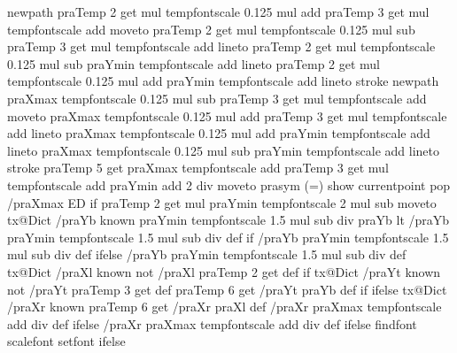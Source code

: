 {{{{          newpath
          praTemp 2 get \pst@number\psxunit\space mul tempfontscale 0.125 mul add
          praTemp 3 get \pst@number\psyunit\space mul tempfontscale add moveto
          praTemp 2 get \pst@number\psxunit\space mul tempfontscale 0.125 mul sub
          praTemp 3 get \pst@number\psyunit\space mul tempfontscale add lineto
          praTemp 2 get \pst@number\psxunit\space mul tempfontscale 0.125 mul sub
          praYmin tempfontscale add lineto
          praTemp 2 get \pst@number\psxunit\space mul tempfontscale 0.125 mul add
          praYmin tempfontscale add lineto
          stroke
          newpath
          praXmax tempfontscale 0.125 mul sub
          praTemp 3 get \pst@number\psyunit\space mul tempfontscale add moveto
          praXmax tempfontscale 0.125 mul add
          praTemp 3 get \pst@number\psyunit\space mul tempfontscale add lineto
          praXmax tempfontscale 0.125 mul add
          praYmin tempfontscale add lineto
          praXmax tempfontscale 0.125 mul sub
          praYmin tempfontscale add lineto
          stroke
          praTemp 5 get {
          praXmax tempfontscale add
          praTemp 3 get \pst@number\psyunit\space mul tempfontscale add praYmin add 2 div moveto
          prasym (=) show currentpoint pop /praXmax ED} if
         praTemp 2 get \pst@number\psxunit\space mul praYmin tempfontscale 2 mul sub moveto %
         tx@Dict /praYb known {
         praYmin tempfontscale 1.5 mul sub \pst@number\psyunit\space div praYb lt {
         /praYb praYmin tempfontscale 1.5 mul sub \pst@number\psyunit\space div def } if }
         { /praYb praYmin tempfontscale 1.5 mul sub \pst@number\psyunit\space div def } ifelse
         /praYb praYmin tempfontscale 1.5 mul sub \pst@number\psyunit\space div def
         tx@Dict /praXl known not {/praXl praTemp 2 get def } if
         tx@Dict /praYt known not {/praYt praTemp 3 get def }
         { praTemp 6 get {/praYt praYb def} if } ifelse
         tx@Dict /praXr known {
         praTemp 6 get { /praXr praXl def }{ /praXr praXmax tempfontscale add \pst@number\psxunit\space div def } ifelse }{%
         /praXr praXmax tempfontscale add \pst@number\psxunit\space div def } ifelse
         \psk@PSfont\space findfont \psk@fontscale\space scalefont setfont } ifelse
}}}
